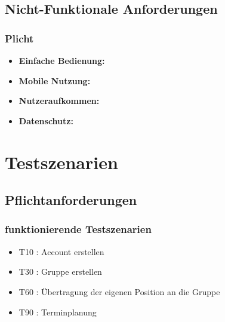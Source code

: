 \documentclass[parskip=full,11pt]{scrartcl}
\begin{document}
	\subsection{Nicht-Funktionale Anforderungen}
		\subsubsection{Plicht}
			\begin{itemize}
                \item \textbf{Einfache Bedienung:}\\
                \item \textbf{Mobile Nutzung:}\\
                \item \textbf{Nutzeraufkommen:}\\
                \item \textbf{Datenschutz:}\\
			\end{itemize}

\section{Testszenarien}

	\subsection{Pflichtanforderungen}
		\subsubsection{funktionierende Testszenarien}
			\begin{itemize}
				\item T10 : Account erstellen
				\item T30 : Gruppe erstellen
				\item T60 : Übertragung der eigenen Position an die Gruppe
				\item T90 : Terminplanung
			\end{itemize}
\end{document}
